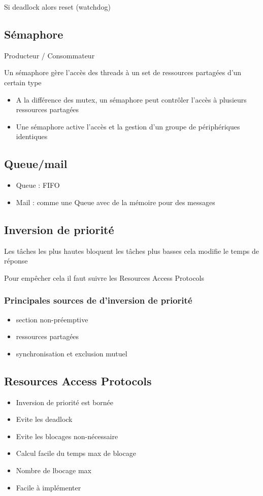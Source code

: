 \documentclass[resume]{subfiles}
\begin{document}
Si deadlock alors reset (watchdog)

\subsection{Sémaphore}

Producteur / Consommateur

Un sémaphore gère l'accès des threads à un set de ressources partagées d'un certain type
\begin{itemize}
\item A la différence des mutex, un sémaphore peut contrôler l'accès à plusieurs ressources partagées
\item Une sémaphore active l'accès et la gestion d'un groupe de périphériques identiques
\end{itemize}

\subsection{Queue/mail}
\begin{itemize}
\item Queue : FIFO
\item Mail : comme une Queue avec de la mémoire pour des messages
\end{itemize}

\subsection{Inversion de priorité}

Les tâches les plus hautes bloquent les tâches plus basses cela modifie le temps de réponse

Pour empêcher cela il faut suivre les Resources Access Protocols

\subsubsection{Principales sources de d'inversion de priorité}
\begin{itemize}
\item section non-préemptive
\item ressources partagées
\item synchronisation et exclusion mutuel
\end{itemize}

\subsection{Resources Access Protocols}
\begin{itemize}
\item Inversion de priorité est bornée
\item Evite les deadlock
\item Evite les blocages non-nécessaire
\item Calcul facile du temps max de blocage
\item Nombre de lbocage max
\item Facile à implémenter
\end{itemize}
\end{document}
